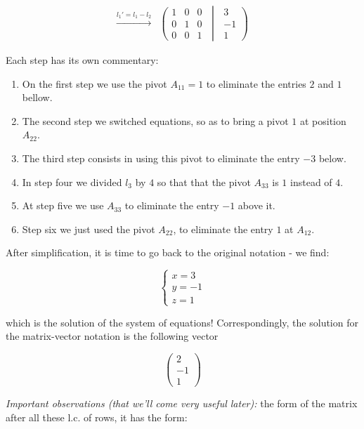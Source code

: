 \documentclass[
  letterpaper,
  DIV=11,
  numbers=noendperiod]{scrartcl}
\theoremstyle{definition}
\theoremstyle{remark}
\begin{document}
\[\begin{align}
\overset{l_1'=l_1-l_2}{\longrightarrow}
&\left(\begin{matrix}1 & 0 & 0 \\0 & 1 & 0 \\0 & 0 & 1 \end{matrix} \;\middle|\;\begin{matrix}3\\-1\\1\end{matrix}\right)
\end{align}
\]

Each step has its own commentary:

\begin{enumerate}
\def\labelenumi{\arabic{enumi}.}
\item
  On the first step we use the pivot \(A_{11}=1\) to eliminate the
  entries \(2\) and \(1\) bellow.
\item
  The second step we switched equations, so as to bring a pivot \(1\) at
  position \(A_{22}\).
\item
  The third step consists in using this pivot to eliminate the entry
  \(-3\) below.
\item
  In step four we divided \(l_3\) by \(4\) so that that the pivot
  \(A_{33}\) is \(1\) instead of \(4\).
\item
  At step five we use \(A_{33}\) to eliminate the entry \(-1\) above it.
\item
  Step six we just used the pivot \(A_{22}\), to eliminate the entry
  \(1\) at \(A_{12}\).
\end{enumerate}

After simplification, it is time to go back to the original notation -
we find:

\[
\begin{cases}
x = 3\\y=-1\\z=1
\end{cases}
\]

which is the solution of the system of equations! Correspondingly, the
solution for the matrix-vector notation is the following vector

\[
\begin{pmatrix}
2\\
-1\\
1
\end{pmatrix}
\]

\emph{Important observations (that we'll come very useful later):} the
form of the matrix after all these l.c. of rows, it has the form:
\end{document}

